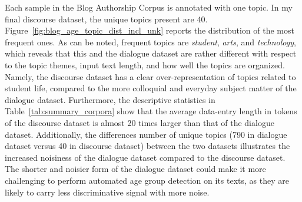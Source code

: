 
Each sample in the Blog Authorship Corpus is annotated with one topic. In my final discourse dataset, the unique topics present are 40. Figure~\ref{fig:blog_age_topic_dist_incl_unk} reports the distribution of the most frequent ones. As can be noted, frequent topics are \emph{student}, \emph{arts}, and \emph{technology}, which 
reveals that this and the dialogue dataset are rather different with respect to the topic themes, input text length, and how well the topics are organized. 
Namely, the discourse dataset has a clear over-representation of topics related to student life, compared to the more colloquial and everyday subject matter of the dialogue dataset. Furthermore, the descriptive statistics in Table~\ref{tab:summary_corpora} show that the average data-entry length in tokens of the discourse dataset is almost 20 times larger than that of the dialogue dataset. Additionally, the differences number of unique topics (790 in dialogue dataset versus 40 in discourse dataset) between the two datasets illustrates the increased noisiness of the dialogue dataset compared to the discourse dataset. The shorter and noisier form of the dialogue dataset could make it more challenging to perform automated age group detection on its texts, as they are likely to carry less discriminative signal with more noise.


